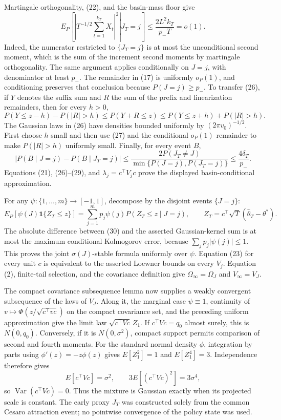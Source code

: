 Martingale orthogonality, (22), and the basin-mass floor give
\[
 E_P\!\left[\left.\left|T^{-1/2}\sum_{t=1}^{k_T}X_t\right|^2\right|J_T=j\right]
 \le \frac{2L^2k_T}{p_-T}=o(1).
\tag{27}
\]
Indeed, the numerator restricted to \(\{J_T=j\}\) is at most the unconditional second moment, which is the sum of the increment second moments by martingale orthogonality. The same argument applies conditionally on \(J=j\), with denominator at least \(p_-\). The remainder in (17) is uniformly \(o_P(1)\), and conditioning preserves that conclusion because \(P(J=j)\ge p_-\). To transfer (26), if \(Y\) denotes the suffix sum and \(R\) the sum of the prefix and linearization remainders, then for every \(h>0\),
\[
 P(Y\le z-h)-P(|R|>h)\le P(Y+R\le z)
 \le P(Y\le z+h)+P(|R|>h).
\tag{28}
\]
The Gaussian laws in (26) have densities bounded uniformly by \((2\pi v_0)^{-1/2}\). First choose \(h\) small and then use (27) and the conditional \(o_P(1)\) remainder to make \(P(|R|>h)\) uniformly small. Finally, for every event \(B\),
\[
 \left|P(B\mid J=j)-P(B\mid J_T=j)\right|
 \le \frac{2P(J_T\ne J)}{\min\{P(J=j),P(J_T=j)\}}
 \le\frac{4\delta_T}{p_-}.
\tag{29}
\]
Equations (21), (26)--(29), and \(\lambda_j=c^\top V_jc\) prove the displayed basin-conditional approximation.

For any \(\psi:\{1,\ldots,m\}\to[-1,1]\), decompose by the disjoint events \(\{J=j\}\):
\[
 E_P[\psi(J)\mathbf1\{Z_T\le z\}]
 =\sum_{j=1}^mp_j\psi(j)P(Z_T\le z\mid J=j),
 \qquad Z_T=c^\top\sqrt T(\widehat\theta_T-\theta^*).
\tag{30}
\]
The absolute difference between (30) and the asserted Gaussian-kernel sum is at most the maximum conditional Kolmogorov error, because \(\sum_jp_j|\psi(j)|\le1\). This proves the joint \(\sigma(J)\)-stable formula uniformly over \(\psi\). Equation (23) for every unit \(c\) is equivalent to the asserted Loewner bounds on every \(V_j\). Equation (2), finite-tail selection, and the covariance definition give \(\Omega_\infty=\Omega_J\) and \(V_\infty=V_J\).

The compact covariance subsequence lemma now supplies a weakly convergent subsequence of the laws of \(V_J\). Along it, the marginal case \(\psi\equiv1\), continuity of \(v\mapsto\Phi(z/\sqrt{c^\top vc})\) on the compact covariance set, and the preceding uniform approximation give the limit law \(\sqrt{c^\top Vc}\,Z_1\). If \(c^\top Vc=q_0\) almost surely, this is \(N(0,q_0)\). Conversely, if it is \(N(0,\sigma^2)\), compact support permits comparison of second and fourth moments. For the standard normal density \(\phi\), integration by parts using \(\phi'(z)=-z\phi(z)\) gives \(E[Z_1^2]=1\) and \(E[Z_1^4]=3\). Independence therefore gives
\[
 E[c^\top Vc]=\sigma^2,
 \qquad 3E[(c^\top Vc)^2]=3\sigma^4,
\]
so \(\operatorname{Var}(c^\top Vc)=0\). Thus the mixture is Gaussian exactly when its projected scale is constant. The early proxy \(J_T\) was constructed solely from the common Cesaro attraction event; no pointwise convergence of the policy state was used.

